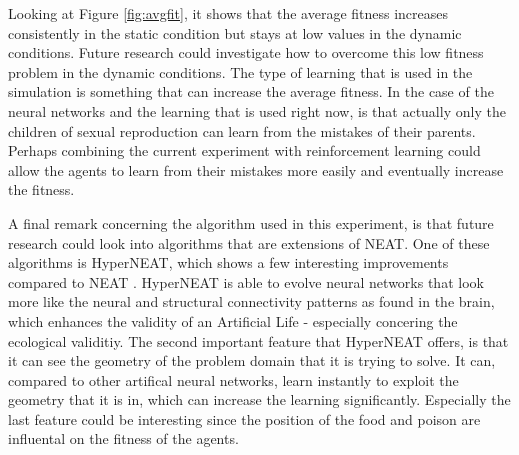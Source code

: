 Looking at Figure \ref{fig:avgfit}, it shows that the average fitness increases consistently in the static condition but stays at low values in the dynamic conditions.
Future research could investigate how to overcome this low fitness problem in the dynamic conditions.
The type of learning that is used in the simulation is something that can increase the average fitness.
In the case of the neural networks and the learning that is used right now, is that actually only the children of sexual reproduction can learn from the mistakes of their parents.
Perhaps combining the current experiment with reinforcement learning could allow the agents to learn from their mistakes more easily and eventually increase the fitness. %

A final remark concerning the algorithm used in this experiment, is that future research could look into algorithms that are extensions of NEAT.
One of these algorithms is HyperNEAT, which shows a few interesting improvements compared to NEAT \cite{stanleyhypercube}.
HyperNEAT is able to evolve neural networks that look more like the neural and structural connectivity patterns as found in the brain, which enhances the validity of an Artificial Life - especially concering the ecological validitiy.
The second important feature that HyperNEAT offers, is that it can see the geometry of the problem domain that it is trying to solve.
It can, compared to other artifical neural networks, learn instantly to exploit the geometry that it is in, which can increase the learning significantly.
Especially the last feature could be interesting since the position of the food and poison are influental on the fitness of the agents.